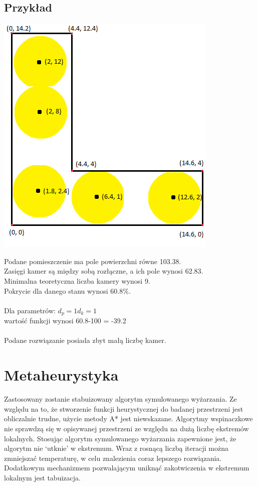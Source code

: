 \documentclass[12pt,a4paper]{article}
\begin{document}
\subsection{Przykład}
\begin{center}
\includegraphics[scale=0.9]{example_projection.png}
\end{center}
Podane pomieszczenie ma pole powierzchni równe 103.38. \\
Zasięgi kamer są między sobą rozłączne, a ich pole wynosi 62.83. \\
Minimalna teoretyczna liczba kamery wynosi 9. \\
Pokrycie dla danego stanu wynosi 60.8\%. \\ \\
Dla parametrów:
$d_p = 1 d_k = 1$ \\
wartość funkcji wynosi 60.8-100 = -39.2 \\ \\
Podane rozwiązanie posiada zbyt małą liczbę kamer.
\section{Metaheurystyka}
Zastosowany zostanie stabuizowany algorytm symulowanego wyżarzania.
Ze względu na to, że stworzenie funkcji heurystycznej do badanej przestrzeni jest obliczalnie
trudne, użycie metody A* jest niewskazane.
Algorytmy wspinaczkowe nie sprawdzą się w opisywanej przestrzeni ze względu na dużą liczbę
ekstremów lokalnych. Stosując algorytm symulowanego wyżarzania zapewnione jest,
że algorytm nie ‘utknie’ w ekstremum. Wraz z rosnącą liczbą iteracji można zmniejszać temperaturę,
w celu znalezienia coraz lepszego rozwiązania. Dodatkowym mechanizmem pozwalającym uniknąć
zakotwiczenia w ekstremum lokalnym jest tabuizacja.\\
\end{document}
